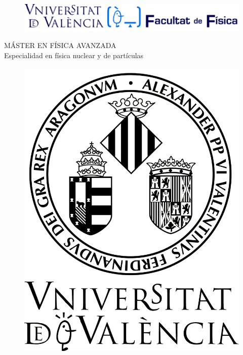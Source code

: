 \begin{titlepage}

\begin{center}
\vspace*{-1in}
\vspace*{1 cm}
\begin{figure}[htb]
\begin{center}
\includegraphics[scale=1]{Logo1.png}
\end{center}
\end{figure}
\vspace*{2 cm}


{\large MÁSTER EN FÍSICA AVANZADA}\\
\vspace*{0.2in}
{\huge Especialidad en física nuclear y de partículas}\\
\vspace*{0.2in}
\vspace*{0.6in}
\end{center}
\vspace*{-1in}
\begin{center}

\begin{figure}[htb]
\begin{center}
\includegraphics[scale=0.1]{Logo2.jpg} 
\end{center}
\end{figure}
\vspace*{1 cm}


\end{center}
\end{titlepage}
